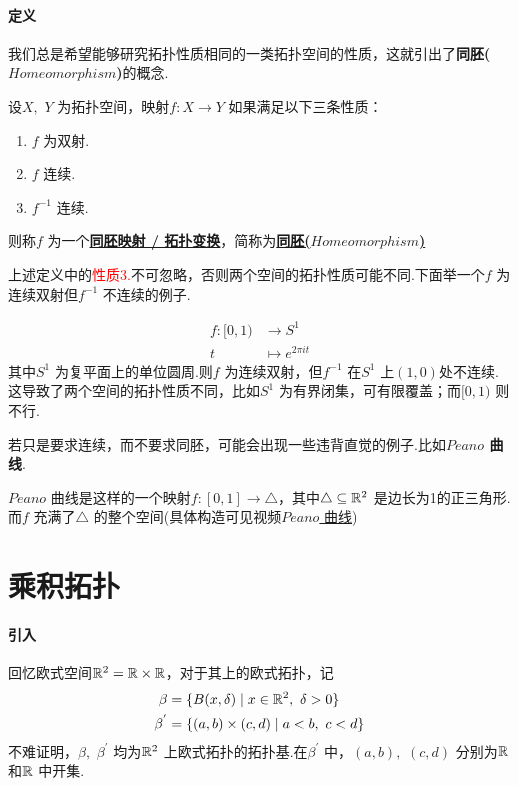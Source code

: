 \paragraph{定义}
	我们总是希望能够研究拓扑性质相同的一类拓扑空间的性质，这就引出了\textbf{同胚($Homeomorphism$)}的概念.
	\begin{defn}\label{def 1.2.4}
		设$X , \,\, Y$ 为拓扑空间，映射$f : X \longrightarrow Y$ 如果满足以下三条性质：
		\begin{enumerate}
			\item $f$ 为双射.
			
			\item $f$ 连续.
			
			\item $f^{-1}$ 连续.
		\end{enumerate}
		则称$f$ 为一个\underline{\textbf{同胚映射 / 拓扑变换}}，简称为\underline{\textbf{同胚($Homeomorphism$)}}
	\end{defn}
	\begin{rmk}
		上述定义中的\textcolor{red}{性质3.}不可忽略，否则两个空间的拓扑性质可能不同.下面举一个$f$ 为连续双射但$f^{-1}$ 不连续的例子.
		\begin{example}\label{ex 1.2.4}
			\begin{align}
				f : [0 , 1) &\longrightarrow S^1\\
				t &\longmapsto e^{2 \pi i t}
			\end{align}
			其中$S^1$ 为复平面上的单位圆周.则$f$ 为连续双射，但$f^{-1}$ 在$S^1$ 上$(1 , 0)$处不连续.\\
			这导致了两个空间的拓扑性质不同，比如$S^1$ 为有界闭集，可有限覆盖；而$[0 , 1)$ 则不行.
		\end{example}
	\end{rmk}

	若只是要求连续，而不要求同胚，可能会出现一些违背直觉的例子.比如\textbf{$Peano$ 曲线}.
	\begin{example}\label{ex 1.2.5}
		$Peano$ 曲线是这样的一个映射$f : [0 , 1] \longrightarrow \triangle$，其中$\triangle \subseteq \mathbb{R}^2$ 是边长为1的正三角形.而$f$ 充满了$\triangle$ 的整个空间(具体构造可见视频\href{https://www.bilibili.com/video/BV1P7411N7fW}{$Peano$ 曲线})
	\end{example}

\newpage
\section{乘积拓扑}
\paragraph{引入}
	回忆欧式空间$\mathbb{R}^2 = \mathbb{R} \times \mathbb{R}$，对于其上的欧式拓扑，记
	\begin{align}
		\beta &= \{ B(x , \delta) \mid x \in \mathbb{R}^2 , \,\, \delta > 0 \}\\
		\beta^{'} &= \{ (a , b) \times (c , d) \mid a < b , \,\, c < d \}
	\end{align}
	不难证明，$\beta , \,\, \beta^{'}$ 均为$\mathbb{R}^2$ 上欧式拓扑的拓扑基.在$\beta^{'}$ 中，$(a , b) , \,\, (c , d)$ 分别为$\mathbb{R}$ 和$\mathbb{R}$ 中开集.
	
